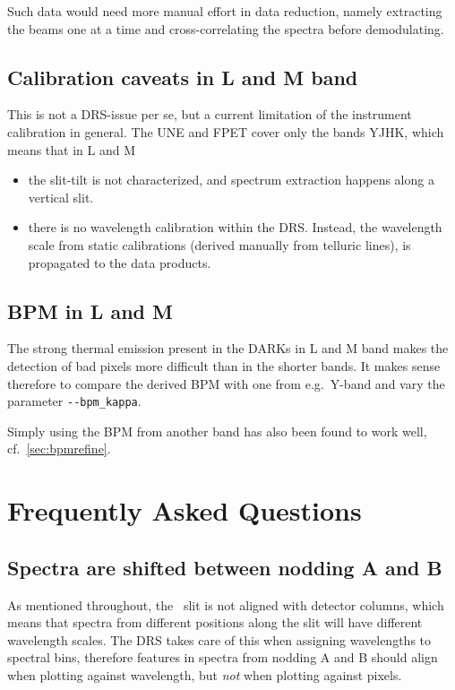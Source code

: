 Such data would need more manual effort in data reduction, namely extracting the
beams one at a time and cross-correlating the spectra before demodulating.


\subsection{Calibration caveats in L and M band}

This is not a DRS-issue per se, but a current limitation of the instrument
calibration in general. The UNE and FPET cover only the bands YJHK, which means
that in L and M
\begin{itemize}
    \item the slit-tilt is not characterized, and spectrum extraction happens
    along a vertical slit.
    \item there is no wavelength calibration within the DRS. Instead, the
    wavelength scale from static calibrations (derived manually from telluric
    lines), is propagated to the data products.
\end{itemize}


\subsection{BPM in L and M}

The strong thermal emission present in the DARKs in L and M band makes the
detection of bad pixels more difficult than in the shorter bands. It makes sense
therefore to compare the derived BPM with one from e.g.~Y-band and vary the
parameter \verb!--bpm_kappa!.

Simply using the BPM from another band has also been found to work well,
cf.~\ref*{sec:bpmrefine}.


\section{Frequently Asked Questions}

\subsection{Spectra are shifted between nodding A and B}
\label{faq:tilt}

As mentioned throughout, the \instrument\ slit is not aligned with detector
columns, which means that spectra from different positions along the slit will
have different wavelength scales. The DRS takes care of this when assigning
wavelengths to spectral bins, therefore features in spectra from nodding A and B
should align when plotting against wavelength, but \emph{not} when plotting
against pixels.

